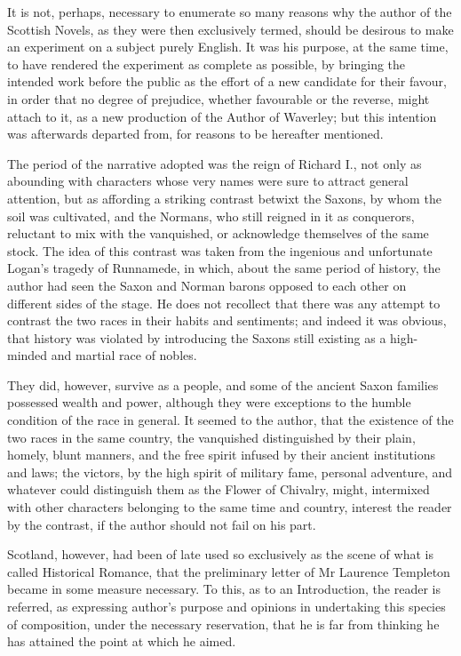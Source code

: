 It is not, perhaps, necessary to enumerate so many reasons why the
author of the Scottish Novels, as they were then exclusively termed,
should be desirous to make an experiment on a subject purely English. It
was his purpose, at the same time, to have rendered the experiment as
complete as possible, by bringing the intended work before the public as
the effort of a new candidate for their favour, in order that no degree
of prejudice, whether favourable or the reverse, might attach to it, as
a new production of the Author of Waverley; but this intention was
afterwards departed from, for reasons to be hereafter mentioned.

The period of the narrative adopted was the reign of Richard I., not
only as abounding with characters whose very names were sure to attract
general attention, but as affording a striking contrast betwixt the
Saxons, by whom the soil was cultivated, and the Normans, who still
reigned in it as conquerors, reluctant to mix with the vanquished, or
acknowledge themselves of the same stock. The idea of this contrast was
taken from the ingenious and unfortunate Logan's tragedy of Runnamede,
in which, about the same period of history, the author had seen the
Saxon and Norman barons opposed to each other on different sides of the
stage. He does not recollect that there was any attempt to contrast the
two races in their habits and sentiments; and indeed it was obvious,
that history was violated by introducing the Saxons still existing as a
high-minded and martial race of nobles.

They did, however, survive as a people, and some of the ancient Saxon
families possessed wealth and power, although they were exceptions to
the humble condition of the race in general. It seemed to the author,
that the existence of the two races in the same country, the vanquished
distinguished by their plain, homely, blunt manners, and the free spirit
infused by their ancient institutions and laws; the victors, by the high
spirit of military fame, personal adventure, and whatever could
distinguish them as the Flower of Chivalry, might, intermixed with other
characters belonging to the same time and country, interest the reader
by the contrast, if the author should not fail on his part.

Scotland, however, had been of late used so exclusively as the scene of
what is called Historical Romance, that the preliminary letter of Mr
Laurence Templeton became in some measure necessary. To this, as to an
Introduction, the reader is referred, as expressing author's purpose and
opinions in undertaking this species of composition, under the necessary
reservation, that he is far from thinking he has attained the point at
which he aimed.

